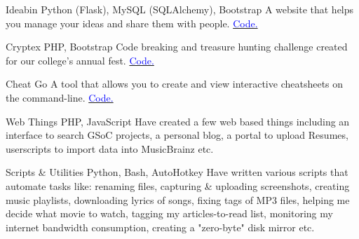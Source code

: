     {Ideabin}
    {}
    {\scriptsize Python (Flask), MySQL (SQLAlchemy), Bootstrap}
    {}
    {
        A website that helps you manage your ideas and share them with people.
        \hfill
        \href{http://github.com/ideabin/ideabin/}{\textcolor{blue}{\scriptsize Code.}}
    }
    \vspace*{0.2\baselineskip}

    {Cryptex}
    {}
    {\scriptsize PHP, Bootstrap}
    {}
    {
        Code breaking and treasure hunting challenge created for our college's annual fest.
        \hfill
        \href{http://github.com/jdevlabs/cryptex/}{\textcolor{blue}{\scriptsize Code.}}
    }
    \vspace*{0.2\baselineskip}

\cventry{}
    {Cheat}
    {}
    {\scriptsize Go}
    {}
    {
        A tool that allows you to create and view interactive cheatsheets on the command-line.
        \hfill
        \href{http://github.com/dufferzafar/cheat/}{\textcolor{blue}{\scriptsize Code.}}
    }
    \vspace*{0.2\baselineskip}

 \cventry{}
     {Web Things}
     {}
     {\scriptsize PHP, JavaScript}
     {}
     {
        Have created a few web based things including
        an interface to search GSoC projects,
        a personal blog,
        a portal to upload Resumes,
        userscripts to import data into MusicBrainz etc.
     }
     \vspace*{0.2\baselineskip}

\cventry{}
    {Scripts \& Utilities}
    {}
    {\scriptsize Python, Bash, AutoHotkey}
    {}
    {
        Have written various scripts that automate tasks like:
        renaming files,
        capturing \& uploading screenshots,
        creating music playlists,
        downloading lyrics of songs,
        fixing tags of MP3 files,
        helping me decide what movie to watch,
        tagging my articles-to-read list,
        monitoring my internet bandwidth consumption,
        creating a "zero-byte" disk mirror etc.
    }
    \vspace*{0.2\baselineskip}
